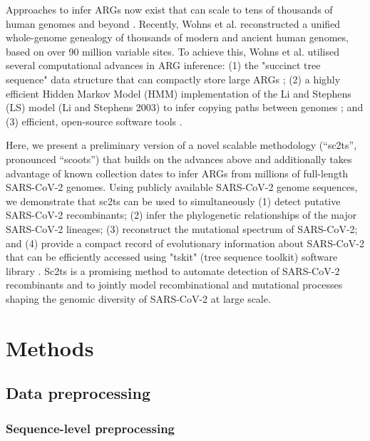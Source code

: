 \documentclass{article}
\begin{document}
Approaches to infer ARGs now exist that can scale to tens of thousands of human
genomes and beyond
\cite{Speidel2019-yh,Kelleher2019-ba,Zhang2021-lf,Schaefer2021-yg}. Recently,
Wohns et al. \cite{Wohns2022-th} reconstructed a unified whole-genome genealogy
of thousands of modern and ancient human genomes, based on over 90 million
variable sites. To achieve this, Wohns et al. \cite{Wohns2022-th} utilised
several computational advances in ARG inference: (1) the "succinct tree
sequence" data structure that can compactly store large ARGs
\cite{Kelleher2018-xc}; (2) a highly efficient Hidden Markov Model (HMM)
implementation of the Li and Stephens (LS) model (Li and Stephens 2003) to
infer copying paths between genomes \cite{Kelleher2019-ba}; and (3) efficient,
open-source software tools
\cite{Baumdicker2022-ep,Kelleher2018-xc,Kelleher2019-ba,Wohns2022-th}.

Here, we present a preliminary version of a novel scalable methodology
(“sc2ts”, pronounced “scoots”) that builds on the advances above and
additionally takes advantage of known collection dates to infer ARGs from
millions of full-length SARS-CoV-2 genomes. Using publicly available SARS-CoV-2
genome sequences, we demonstrate that sc2ts can be used to simultaneously (1)
detect putative SARS-CoV-2 recombinants; (2) infer the phylogenetic
relationships of the major SARS-CoV-2 lineages; (3) reconstruct the mutational
spectrum of SARS-CoV-2; and (4) provide a compact record of evolutionary
information about SARS-CoV-2 that can be efficiently accessed using "tskit"
(tree sequence toolkit) software library \cite{Kelleher2018-xc}. Sc2ts is a
promising method to automate detection of SARS-CoV-2 recombinants and to
jointly model recombinational and mutational processes shaping the genomic
diversity of SARS-CoV-2 at large scale.

\section{Methods}

\subsection{Data preprocessing}

\subsubsection{Sequence-level preprocessing}
\end{document}
